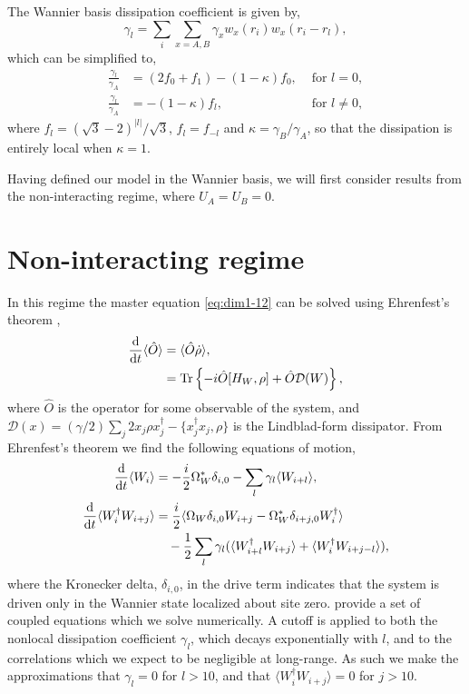 The Wannier basis dissipation coefficient is given by,
\begin{equation}
	\gamma_{l} = \sum_{i} \sum_{x=A,B} \gamma_{x}w_{x}(r_{i})w_{x}(r_{i} - r_{l}),
	\label{eq:dim1-21}
\end{equation}
which can be simplified to,
\begin{align}
	\frac{\gamma_{l}}{\gamma_{A}} &= (2f_{0} + f_{1}) - (1 - \kappa)f_{0}, &\text{ for }l=0, \label{eq:dim1-22} \\
	\frac{\gamma_{l}}{\gamma_{A}} &= -(1-\kappa)f_{l}, &\text{ for }l \neq 0, \label{eq:dim1-23}
\end{align}
where \(f_{l} = (\sqrt{3}-2)^{|l|}/\sqrt{3}\), \(f_{l}=f_{-l}\) and \(\kappa = \gamma_{B}/\gamma_{A}\), so that the dissipation is entirely local when \(\kappa = 1\). 

Having defined our model in the Wannier basis, we will first consider results from the non-interacting regime, where \(U_{A} = U_{B} = 0\).

\section{Non-interacting regime}
In this regime the master equation \cref{eq:dim1-12} can be solved using Ehrenfest's theorem \cite{Ehrenfest1927,BP_Ehrenfest},
\begin{align}
	\frac{\mathrm{d}}{\mathrm{d}t} \langle \hat{O} \rangle &= \langle \hat{O} \dot{\rho} \rangle, \notag \\
	&= \mathrm{Tr}\left\{ -i\hat{O}[H_{W}, \rho] + \hat{O}\mathcal{D}(W) \right\},
	\label{eq:dim2-1}
\end{align}
where \(\hat{O}\) is the operator for some observable of the system, and \(\mathcal{D}(x)=(\gamma/2)\sum_{j}2x_{j}\rho x_{j}^{\dagger} - \{x_{j}^{\dagger}x_{j}, \rho\}\) is the Lindblad-form dissipator. From Ehrenfest's theorem we find the following equations of motion,
\begin{align}
	\frac{\mathrm{d}}{\mathrm{d}t} \langle W_{i} \rangle &= -\frac{i}{2}\Omega_{W}^{*}\delta_{i,0} - \sum_{l} \gamma_{l}\langle W_{i+l} \rangle, \label{eq:dim2-2} \\
	\frac{\mathrm{d}}{\mathrm{d}t} \langle W_{i}^{\dagger}W_{i+j} \rangle &= \frac{i}{2} \langle \Omega_{W}\delta_{i,0} W_{i+j} - \Omega_{W}^{*}\delta_{i+j,0}W_{i}^{\dagger} \rangle \notag \\ 
	&\quad - \frac{1}{2}\sum_{l} \gamma_{l} (\langle W_{i+l}^{\dagger}W_{i+j} \rangle + \langle W_{i}^{\dagger}W_{i+j-l}\rangle), \label{eq:dim2-3}
\end{align}
where the Kronecker delta, \(\delta_{i,0}\), in the drive term indicates that the system is driven only in the Wannier state localized about site zero.  provide a set of coupled equations which we solve numerically. A cutoff is applied to both the nonlocal dissipation coefficient \(\gamma_{l}\), which decays exponentially with \(l\), and to the correlations which we expect to be negligible at long-range. As such we make the approximations that \(\gamma_{l} = 0\) for \(l > 10\), and that \(\langle W_{i}^{\dagger}W_{i+j} \rangle = 0\) for \(j > 10\).

